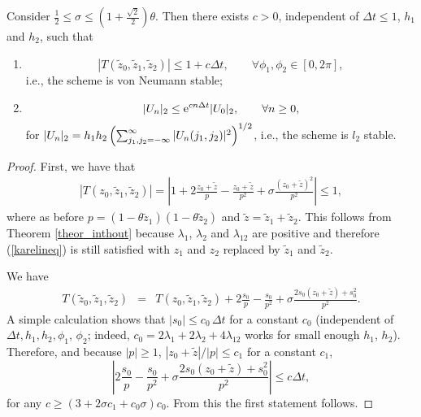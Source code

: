 {\begin{theorem}
	Consider $\frac{1}{2} \le \sigma \le \left(1 + \frac{\sqrt{2}}{2} \right) \theta$. Then there exists $c>0$, independent of $\Delta t\le 1$, $h_1$ and $h_2$, such that
	\begin{enumerate}
	\item
	\begin{equation}
	|T(\tilde{z}_0, \tilde{z}_1, \tilde{z}_2)| \le 1 + c \Delta t, \qquad \forall \phi_1, \phi_2 \in [0,2\pi],
	\end{equation}
	i.e., the scheme is von Neumann stable;
	\item
	\label{part2}
	\begin{equation}
	|U_n|_2 %
	\le {\rm e}^{c n \Delta t} |U_0|_2, \qquad \forall n\ge 0,
	\end{equation}
	for $|U_n|_2 = h_1 h_2 \left(\sum_{j_1,j_2=-\infty}^\infty |U_n(j_1,j_2)|^2\right)^{\scriptsize 1/2}$, i.e., the scheme is $l_2$ stable.
	\end{enumerate}
\end{theorem}
\begin{proof}



First, we have that
\begin{eqnarray*}
|T({z}_0, \tilde{z}_1, \tilde{z}_2)| = \left|1 + 2 \frac{{z}_0 + \tilde{z}}{p} - \frac{{z}_0 + \tilde{z}}{p^2} + \sigma \frac{({z}_0 + \tilde{z})^2}{p^2}\right|
\le 1,
\end{eqnarray*}
where as before $p = (1 - \theta \tilde{z}_1) (1 - \theta \tilde{z}_2)$ and $\tilde{z} = \tilde{z}_1 + \tilde{z}_2$. 
This follows from Theorem \ref{theor_inthout} because $\lambda_1$, $\lambda_2$ and $\lambda_{12}$ are positive and therefore (\ref{karelineq}) is still satisfied with $z_1$ and $z_2$ replaced by $\tilde{z}_1$ and $\tilde{z}_2$.

We have
\begin{eqnarray*}
T(\tilde{z}_0, \tilde{z}_1, \tilde{z}_2) &=&
T({z}_0, \tilde{z}_1, \tilde{z}_2) +
2 \frac{s_0}{p} - \frac{s_0}{p^2} + \sigma \frac{2 s_0 (z_0 + \tilde{z}) + s_0^2}{p^2}.
\end{eqnarray*}
A simple calculation shows that $|s_0|\le c_0 \, \Delta t$ for a constant $c_0$ (independent of $\Delta t, h_1, h_2, \phi_1$, $\phi_2$;
indeed, $c_0=2 \lambda_1 + 2 \lambda_2 + 4 \lambda_{12}$
works for small enough $h_1$, $h_2$).
Therefore, and because $|p|\ge 1$, $|z_0 + \tilde{z}|/|p|\le c_1$ for a constant $c_1$,
\[
\left|2 \frac{s_0}{p} - \frac{s_0}{p^2} + \sigma \frac{2 s_0 (z_0 + \tilde{z}) + s_0^2}{p^2} \right|
\le c \Delta t,
\]
for any $c\ge (3 + 2 \sigma c_1 + c_0 \sigma) c_0$.
From this the first statement follows.


\end{proof}}
